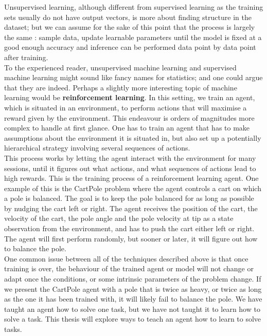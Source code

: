 Unsupervised learning, although different from supervised learning as the
training sets usually do not have output vectors, is more about finding
structure in the dataset; but we can assume for the sake of this point that
the process is largely the same : sample data, update learnable parameters
until the model is fixed at a good enough accuracy and inference can be
performed data point by data point after training.\\

To the experienced reader, unsupervised machine learning and supervised machine
learning might sound like fancy names for statistics; and one could argue that
they are indeed. Perhaps a slightly more interesting topic of machine learning
would be \textbf{reinforcement learning}. In this setting, we train an agent, 
which is situated in an environment, to perform actions that will maximise
a reward given by the environment. This endeavour is orders of magnitudes more
complex to handle at first glance. One has to train an agent that has to make
assumptions about the environment it is situated in, but also set up a
potentially hierarchical strategy involving several sequences of actions.\\

This process works by letting the agent interact with the environment for many
sessions, until it figures out what actions, and what sequences of actions lead
to high rewards. This is the training process of a reinforcement learning agent.
One example of this is the CartPole problem \cite{barto-cartpole} where the
agent controls a cart on which a pole is balanced. The goal is to keep the
pole balanced for as long as possible by nudging the cart left or right. The
agent receives the position of the cart, the velocity of the cart, the pole
angle and the pole velocity at tip as a state observation from the environment,
and has to push the cart either left or right. The agent will first perform
randomly, but sooner or later, it will figure out how to balance the pole.\\

One common issue between all of the techniques described above is that once
training is over, the behaviour of the trained agent or model will not change
or adapt once the conditions, or some intrinsic parameters of the problem
change. If we present the CartPole agent with a pole that is twice as heavy,
or twice as long as the one it has been trained with, it will likely fail to 
balance the pole. We have taught an agent how to solve one task, but we have
not taught it to learn how to solve a task. This thesis will explore ways to 
teach an agent how to learn to solve tasks.



